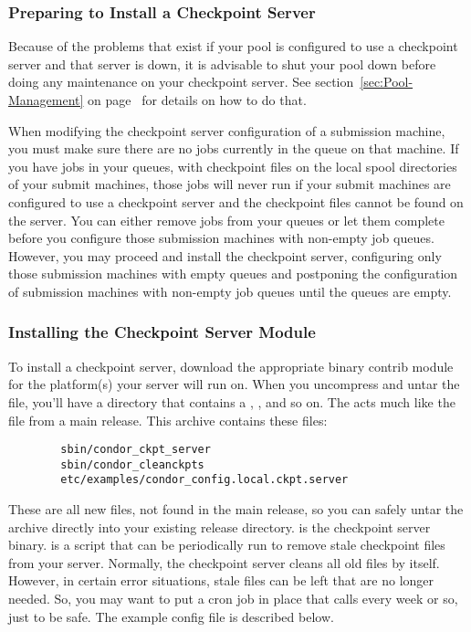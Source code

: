 \subsubsection{\label{sec:Prepare-Ckpt-Server}
Preparing to Install a Checkpoint Server} 

Because of the problems that exist if your pool is configured to use a
checkpoint server and that server is down, it is advisable to shut
your pool down before doing any maintenance on your checkpoint
server.  
See section~\ref{sec:Pool-Management} on
page~\pageref{sec:Pool-Management} for details on how to do that. 

When modifying the checkpoint server configuration of a submission
machine, you must make sure there are no jobs currently in the queue
on that machine.
If you have jobs in your queues, with checkpoint files on the local
spool directories of your submit machines, those jobs will never run
if your submit machines are configured to use a checkpoint server and
the checkpoint files cannot be found on the server.  
You can either remove jobs from your queues or let them complete
before you configure those submission machines with non-empty job
queues.
However, you may proceed and install the checkpoint server,
configuring only those submission machines with empty queues and
postponing the configuration of submission machines with non-empty job
queues until the queues are empty.

\subsubsection{\label{sec:Install-Ckpt-Server-Module}
Installing the Checkpoint Server Module} 

To install a checkpoint server, download the appropriate binary
contrib module for the platform(s) your server will run on.
When you uncompress and untar the file, you'll have a directory that
contains a , , and so on.
The  acts much like the  file
from a main release.
This archive contains these files:
\begin{verbatim}
        sbin/condor_ckpt_server
        sbin/condor_cleanckpts
        etc/examples/condor_config.local.ckpt.server
\end{verbatim}
These are all new files, not found in the main release, so you can
safely untar the archive directly into your existing release
directory. 
 is the checkpoint server binary.
 is a script that can be periodically run to
remove stale checkpoint files from your server.  
Normally, the checkpoint server cleans all old files by itself.  
However, in certain error situations, stale files can be left that are
no longer needed. 
So, you may want to put a cron job in place that calls
 every week or so, just to be safe.
The example config file is described below.

